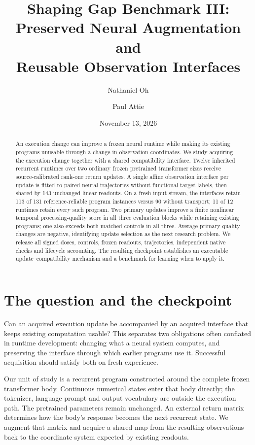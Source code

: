 \documentclass[11pt]{article}
\title{Shaping Gap Benchmark III:\\Preserved Neural Augmentation and\\Reusable Observation Interfaces}
\author{Nathaniel Oh \and Paul Attie}
\date{November 13, 2026}
\begin{document}
\maketitle
\begin{abstract}
An execution change can improve a frozen neural runtime while making its existing programs unusable through a change in observation coordinates. We study acquiring the execution change together with a shared compatibility interface. Twelve inherited recurrent runtimes over two ordinary frozen pretrained transformer sizes receive source-calibrated rank-one return updates. A single affine observation interface per update is fitted to paired neural trajectories without functional target labels, then shared by 143 unchanged linear readouts. On a fresh input stream, the interfaces retain 113 of 131 reference-reliable program instances versus 90 without transport; 11 of 12 runtimes retain every such program. Two primary updates improve a finite nonlinear temporal processing-quality score in all three evaluation blocks while retaining existing programs; one also exceeds both matched controls in all three. Average primary quality changes are negative, identifying update selection as the next research problem. We release all signed doses, controls, frozen readouts, trajectories, independent native checks and lifecycle accounting. The resulting checkpoint establishes an executable update--compatibility mechanism and a benchmark for learning when to apply it.
\end{abstract}

\section{The question and the checkpoint}
Can an acquired execution update be accompanied by an acquired interface that keeps existing computation usable? This separates two obligations often conflated in runtime development: changing what a neural system computes, and preserving the interface through which earlier programs use it. Successful acquisition should satisfy both on fresh experience.

Our unit of study is a recurrent program constructed around the complete frozen transformer body. Continuous numerical states enter that body directly; the tokenizer, language prompt and output vocabulary are outside the execution path. The pretrained parameters remain unchanged. An external return matrix determines how the body's response becomes the next recurrent state. We augment that matrix and acquire a shared map from the resulting observations back to the coordinate system expected by existing readouts.
\end{document}
